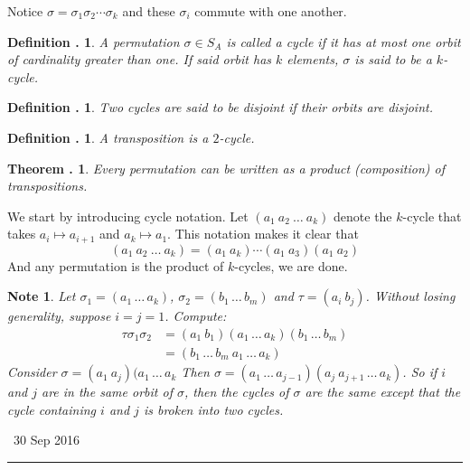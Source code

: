 \documentclass[twoside]{report}
\newcounter{Lecture}
\newcommand{\newLec}[1]{
  \stepcounter{Lecture}
  \noindent{\Large\bf Lecture \arabic{Lecture}} \, #1 \hfill  \rule[1ex]{2.5in}{.1pt} \vspace{1em}
}
\theoremstyle{myts}
\newcounter{c}[Lecture]
\newtheorem{dfn}[c]{Definition \arabic{Lecture}.}
\newtheorem{thm}[c]{Theorem \arabic{Lecture}.}
\newtheorem*{nte}{Note}
\newcounter{ex}
\newenvironment{prf}{
  \noindent\begin{mdframed}[style=prf]}{\end{mdframed} \vspace{1em}
}
\begin{document}
\noindent
Notice \( \sigma = \sigma_1\sigma_2 \cdots \sigma_k \) and these $\sigma_i$ commute with one another.

\begin{dfn}
  A permutation \( \sigma\in S_A \) is called a \emph{cycle} if it has at most one orbit of cardinality greater than one. If said orbit has $k$ elements, $\sigma$ is said to be a \emph{$k$-cycle}.
\end{dfn}

\begin{dfn}
  Two cycles are said to be \emph{disjoint} if their orbits are disjoint.
\end{dfn}

\begin{dfn}
  A \emph{transposition} is a $2$-cycle.
\end{dfn}

\begin{thm}
  Every permutation can be  written as a product (composition) of transpositions.
\end{thm}

\begin{prf}
  We start by introducing cycle notation. Let \( ( a_1 \: a_2 \: \ldots \: a_k ) \) denote the $k$-cycle that takes \( a_i \mapsto a_{i+1} \) and \( a_k \mapsto a_1 \). This notation makes it clear that
  \[
    ( a_1 \: a_2 \: \ldots \: a_k ) = ( a_1 \: a_k )\cdots (a_1 \: a_3 ) (a_1 \: a_2)
  \]
  And any permutation is the product of $k$-cycles, we are done.
\end{prf}

\begin{nte}
  Let \( \sigma_1 = (a_1 \, \ldots \, a_k ) \), \( \sigma_2 = (b_1 \, \ldots \, b_m ) \) and \( \tau = (a_i \: b_j ) \). Without losing generality, suppose \( i = j = 1 \). Compute:
  \begin{align*}
    \tau\sigma_1\sigma_2 &= (a_1 \: b_1 ) (a_1 \, \ldots \, a_k ) (b_1 \, \ldots \, b_m) \\
      &= (b_1 \, \ldots \, b_m \: a_1 \, \ldots \, a_k )
  \end{align*}
  Consider \( \sigma = (a_1 \: a_j ) (a_1 \, \ldots \, a_k \) Then \( \sigma = (a_1 \, \ldots \, a_{j-1} ) (a_j \:  a_{j+1}\, \ldots \, a_k ) \). So if $i$ and $j$ are in the same orbit of $\sigma$, then the cycles of $\sigma$ are the same except that the cycle containing $i$ and $j$ is broken into two cycles.
\end{nte}

\newLec{30 Sep 2016}
\end{document}
